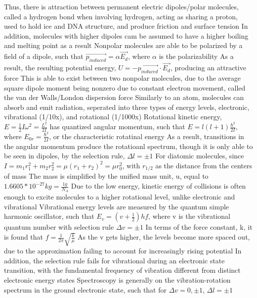 \documentclass[11 pt, twoside]{article}
\newenvironment{outline*}
{
	\begin{outline}[enumerate]
	}
	{\end{outline}
}
\begin{document}
\begin{outline*}
		\3 Thus, there is attraction between permanent electric dipoles/polar molecules, called a hydrogen bond when involving hydrogen, acting as sharing a proton, used to hold ice and DNA structure, and produce friction and surface tension
		\3 In addition, molecules with higher dipoles cam be assumed to have a higher boiling and melting point as a result
	\2 Nonpolar molecules are able to be polarized by a field of a dipole, such that $\vec{p_{induced}} = \alpha \vec{E_d}$, where $\alpha$ is the polarizability
		\3 As a result, the resulting potential energy, $U = -\vec{p_{induced}} \cdot \vec{E_d}$, producing an attractive force
		\3 This is able to exist between two nonpolar molecules, due to the average square dipole moment being nonzero due to constant electron movement, called the van der Walls/London dispersion force
\1 Similarly to an atom, molecules can absorb and emit radiation, seperated into three types of energy levels, electronic, vibrational (1/10x), and rotational (1/1000x)
	\2 Rotational kinetic energy, $E = \frac{1}{2}I\omega^2 = \frac{L^2}{2I}$ has quantized angular momentum, such that $E = l(l + 1)\frac{\hbar^2}{2I}$, where $E_{0r} = \frac{\hbar^2}{2I}$, or the characteristic rotatinal energy
		\3 As a result, transitions in the angular momentum produce the rotatioanl spectrum, though it is only able to be seen in dipoles, by the selection rule, $\Delta l = \pm 1$
		\3 For diatomic molecules, since $I = m_1r_1^2 + m_2r_2^2 = \mu (r_1 + r_2)^2 = \mu r_0^2$, with $r_{1/2}$ as the distance from the centers of mass
			\4 The mass is simplified by the unified mass unit, u, equal to $1.6605 * 10^{-27} kg = \frac{1 g}{N_A}$
		\3 Due to the low energy, kinetic energy of collisions is often enough to excite molecules to a higher rotational level, unlike electronic and vibrational
	\2 Vibrational energy levels are measured by the quantum simple harmonic oscillator, such that $E_v = (v + \frac{1}{2})hf$, where v is the vibrational quantum number with selection rule $\Delta v = \pm 1$
		\3 In terms of the force constant, k, it is found that $f = \frac{1}{2\pi}\sqrt{\frac{k}{\mu}}$
		\3 As the v gets higher, the levels become more spaced out, due to the approximation failing to account for increasingly rising potential
		\3 In addition, the selection rule fails for vibrational during an electronic state transition, with the fundamental frequency of vibration different from distinct electronic energy states
	\2 Spectroscopy is generally on the vibration-rotation spectrum in the ground electronic state, such that for $\Delta v = 0, \pm1$, $\Delta l = \pm 1$

\end{outline*}
\end{document}
